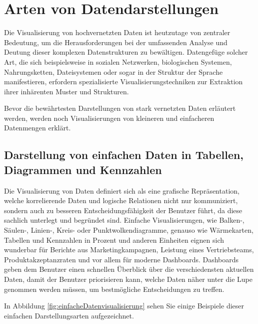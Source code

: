 \section{Arten von Datendarstellungen}

Die Visualisierung von hochvernetzten Daten ist heutzutage von zentraler Bedeutung, um die Herausforderungen bei der umfassenden Analyse und Deutung dieser komplexen Datenstrukturen zu bewältigen. Datengefüge solcher Art, die sich beispielsweise in sozialen Netzwerken, biologischen Systemen, Nahrungsketten, Dateisystemen oder sogar in der Struktur der Sprache manifestieren, erfordern spezialisierte Visualisierungstechniken zur Extraktion ihrer inhärenten Muster und Strukturen. \cite{fry2008visualizing}

Bevor die bewährtesten Darstellungen von stark vernetzten Daten erläutert werden, werden noch Visualisierungen von kleineren und einfacheren Datenmengen erklärt.

\subsection{Darstellung von einfachen Daten in Tabellen, Diagrammen und Kennzahlen}

Die Visualisierung von Daten definiert sich als eine grafische Repräsentation, welche korrelierende Daten und logische Relationen nicht nur kommuniziert, sondern auch zu besseren Entscheidungsfähigkeit der Benutzer führt, da diese sachlich unterlegt und begründet sind. Einfache Visualisierungen, wie Balken-, Säulen-, Linien-, Kreis- oder Punktwolkendiagramme, genauso wie Wärmekarten, Tabellen und Kennzahlen in Prozent und anderen Einheiten eignen sich wunderbar für Berichte aus Marketingkampagnen, Leistung eines Vertriebsteams, Produktakzeptanzraten und vor allem für moderne Dashboards. Dashboards geben dem Benutzer einen schnellen Überblick über die verschiedensten aktuellen Daten, damit der Benutzer priorisieren kann, welche Daten näher unter die Lupe genommen werden müssen, um bestmögliche Entscheidungen zu treffen. \cite{2020simplevis}

In Abbildung \ref{fig:einfacheDatenvisualisierung} sehen Sie einige Beispiele dieser einfachen Darstellungsarten aufgezeichnet. 

